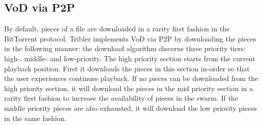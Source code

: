 \subsection{VoD via P2P} 
\label{sec:download_alg}
By default, pieces of a file are downloaded in a rarity first fashion in the BitTorrent protocol. Tribler implements VoD via P2P by downloading the pieces in the following manner\cite{libswift12}: the download algorithm discerns three priority tiers: high-, middle- and low-priority. The high priority section starts from the current playback position. First it downloads the pieces in this section in-order so that the user experiences continues playback. If no pieces can be downloaded from the high priority section, it will download the pieces in the mid priority section in a rarity first fashion to increase the availability of pieces in the swarm. If the middle priority pieces are also exhausted, it will download the low priority pieces in the same fashion. 

